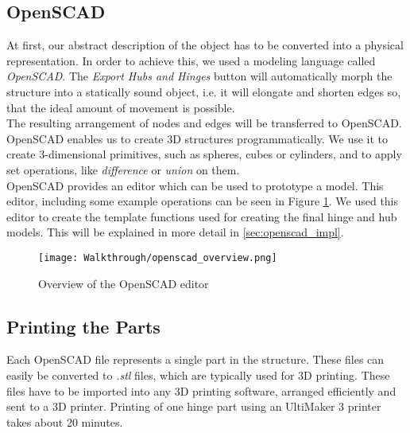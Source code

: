 \subsection{OpenSCAD}
At first, our abstract description of the object has to be converted into a physical representation. In order to achieve this, we used a modeling language called \textit{OpenSCAD}. The \textit{Export Hubs and Hinges} button will automatically morph the structure into a statically sound object, i.e. it will elongate and shorten edges so, that the ideal amount of movement is possible. \\
The resulting arrangement of nodes and edges will be transferred to OpenSCAD. OpenSCAD enables us to create 3D structures programmatically. We use it to create 3-dimensional primitives, such as spheres, cubes or cylinders, and to apply set operations, like \textit{difference} or \textit{union} on them.\\
OpenSCAD provides an editor which can be used to prototype a model. This editor, including some example operations can be seen in Figure \ref{fig:openscad_overview}. We used this editor to create the template functions used for creating the final hinge and hub models. This will be explained in more detail in \ref{sec:openscad_impl}.
\begin{figure}[h!]
    \texttt{[image: Walkthrough/openscad\_overview.png]}
    \centering
    \caption{Overview of the OpenSCAD editor}
    \label{fig:openscad_overview}
\end{figure}

\subsection{Printing the Parts}
Each OpenSCAD file represents a single part in the structure. These files can easily be converted to \textit{.stl} files, which are typically used for 3D printing. These files have to be imported into any 3D printing software, arranged efficiently and sent to a 3D printer. Printing of one hinge part using an UltiMaker 3 printer takes about 20 minutes.

